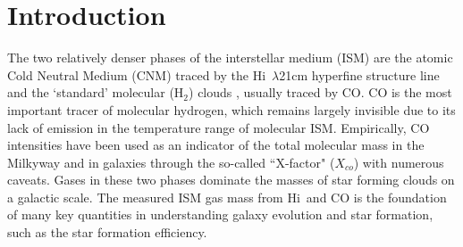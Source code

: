 \documentclass[preprint]{emulateapj}
\def\hi{H{\sc i}}
\def\xco{$X_{co}$}
\begin{document}
\begin{abstract}

\end{abstract}


\section{Introduction}
 The two relatively denser phases of the interstellar medium (ISM) are the atomic Cold Neutral Medium (CNM) traced by the \hi\ $\lambda$21cm hyperfine structure line and the `standard' molecular (H$_2$) clouds , usually traced by CO. CO is the most important tracer of molecular hydrogen, which remains largely invisible due to its lack of emission in the temperature range of molecular ISM. Empirically, CO intensities have been used as an indicator of the total molecular mass in the Milkyway and in galaxies through the so-called ``X-factor" (\xco) with numerous  caveats.  Gases in these two phases dominate the masses of star forming clouds on a galactic scale. The measured ISM gas mass from \hi\ and CO is the foundation of many key quantities in understanding galaxy evolution and star formation, such as the star formation efficiency.
 
\end{document}
